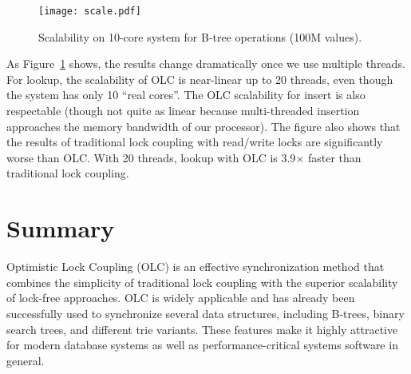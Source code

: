 \documentclass[11pt]{article}
\begin{document}
\begin{figure}
  \centering
  \texttt{[image: scale.pdf]}
  \vspace{0.2cm}
  \caption{Scalability on 10-core system for B-tree operations (100M values).}
  \label{fig:scale}
\end{figure}

As Figure~\ref{fig:scale} shows, the results change dramatically once we use multiple threads.
For lookup, the scalability of OLC is near-linear up to 20 threads, even though the system has only 10 ``real cores''.
The OLC scalability for insert is also respectable (though not quite as linear because multi-threaded insertion approaches the memory bandwidth of our processor).
The figure also shows that the results of traditional lock coupling with read/write locks are significantly worse than OLC.
With 20 threads, lookup with OLC is 3.9$\times$ faster than traditional lock coupling.

\section{Summary}\label{sec:conc}

Optimistic Lock Coupling (OLC) is an effective synchronization method that combines the simplicity of traditional lock coupling with the superior scalability of lock-free approaches.
OLC is widely applicable and has already been successfully used to synchronize several data structures, including B-trees, binary search trees, and different trie variants.
These features make it highly attractive for modern database systems as well as performance-critical systems software in general.
\end{document}
